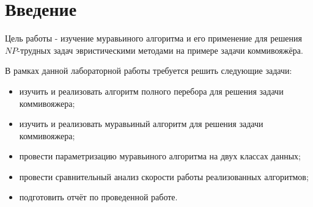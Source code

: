 \chapter*{Введение}

Цель работы - изучение муравьиного алгоритма и его применение для решения $NP$-трудных задач эвристическими методами на примере задачи коммивояжёра.

В рамках данной лабораторной работы требуется решить следующие задачи:
\begin{itemize}
    \item изучить и реализовать алгоритм полного перебора для решения задачи коммивояжера;
    \item изучить и реализовать муравьиный алгоритм для решения задачи коммивояжера;
    \item провести параметризацию муравьиного алгоритма на двух классах данных;
    \item провести сравнительный анализ скорости работы реализованных алгоритмов;
    \item подготовить отчёт по проведенной работе.
\end{itemize}


